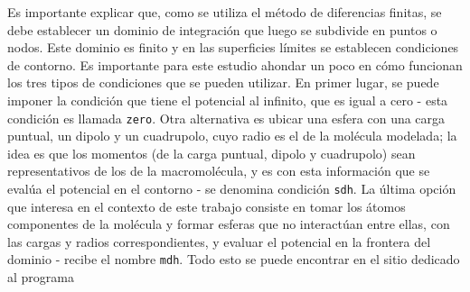 \documentclass[12pt, twoside, onehalfspace, numbers, spanish]{ezthesis}
\numberwithin{equation}{section}
\begin{document}
Es importante explicar que, como se utiliza el método de diferencias finitas, se debe establecer un dominio de integración que luego se subdivide en puntos o nodos. Este dominio es finito y en las superficies límites se establecen condiciones de contorno. Es importante para este estudio ahondar un poco en cómo funcionan los tres tipos de condiciones que se pueden utilizar. En primer lugar, se puede imponer la condición que tiene el potencial al infinito, que es igual a cero - esta condición es llamada \texttt{zero}. Otra alternativa es ubicar una esfera con una carga puntual, un dipolo y un cuadrupolo, cuyo radio es el de la molécula modelada; la idea es que los momentos (de la carga puntual, dipolo y cuadrupolo) sean representativos de los de la macromolécula, y es con esta información que se evalúa el potencial en el contorno - se denomina condición \texttt{sdh}. La última opción que interesa en el contexto de este trabajo consiste en tomar los átomos componentes de la molécula y formar esferas que no interactúan entre ellas, con las cargas y radios correspondientes, y evaluar el potencial en la frontera del dominio - recibe el nombre \texttt{mdh}. Todo esto se puede encontrar en el sitio dedicado al programa \cite{pdb2pqr_1}
\end{document}
